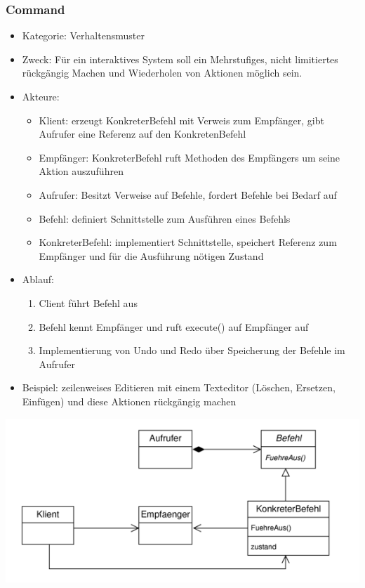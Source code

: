 \documentclass[11pt, fleqn, a4paper, leqno]{scrartcl} %
\begin{document}
		\subsubsection{Command}
			\begin{itemize}
				\item Kategorie: Verhaltensmuster
				\item Zweck: Für ein interaktives System soll ein Mehrstufiges, nicht limitiertes rückgängig Machen und Wiederholen von Aktionen möglich sein.
				\item Akteure: 
					\begin{itemize}
						\item Klient: erzeugt KonkreterBefehl mit Verweis zum Empfänger, gibt Aufrufer eine Referenz auf den KonkretenBefehl
						\item Empfänger: KonkreterBefehl ruft Methoden des Empfängers um seine Aktion auszuführen
						\item Aufrufer: Besitzt Verweise auf Befehle, fordert Befehle  bei Bedarf auf
						\item Befehl: definiert Schnittstelle zum Ausführen eines Befehls
						\item KonkreterBefehl: implementiert Schnittstelle, speichert Referenz zum Empfänger und für die Ausführung nötigen Zustand
					\end{itemize}
				\item Ablauf:
					\begin{enumerate}
						\item Client führt Befehl aus
						\item Befehl kennt Empfänger und ruft execute() auf Empfänger auf
						\item Implementierung von Undo und Redo über Speicherung der Befehle im Aufrufer
					\end{enumerate}
				\item Beispiel: zeilenweises Editieren mit einem Texteditor (Löschen, Ersetzen, Einfügen) und diese Aktionen rückgängig machen
			\end{itemize}
			\includegraphics[scale=0.8]{images/commando.png}
			\newpage
\end{document}
